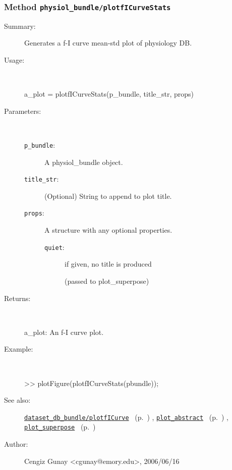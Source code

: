 \subsubsection[Method \texttt{plotfICurveStats}]{Method \texttt{physiol\_bundle/plotfICurveStats}}%
%
\label{ref_physiol_bundle__plotfICurveStats}%
\hypertarget{ref_physiol_bundle__plotfICurveStats}{}%
\begin{description}
\item[Summary:]Generates a f-I curve mean-std plot of physiology DB.
%
\item[Usage:]~%
\begin{lyxcode}%
a\_plot = plotfICurveStats(p\_bundle, title\_str, props)
%
\end{lyxcode}%
%
%
\item[Parameters:]~
\begin{description}%
\item[\texttt{p\_bundle}:]
 A physiol\_bundle object.
\item[\texttt{title\_str}:]
 (Optional) String to append to plot title.
\item[\texttt{props}:]
 A structure with any optional properties.
\begin{description}%
\item[\texttt{quiet}:]
 if given, no title is produced

(passed to plot\_superpose)\end{description}%
\end{description}%
%
\item[Returns:]~

	a\_plot: An f-I curve plot.
%
\item[Example:]~
\begin{lyxcode} >> plotFigure(plotfICurveStats(pbundle));\\%
\end{lyxcode}
%
\item[See also:]%
\hyperlink{ref_dataset_db_bundle__plotfICurve}{\texttt{dataset\_db\_bundle/plotfICurve}}%
\ (p.~\pageref{ref_dataset_db_bundle__plotfICurve})%
%
, \hyperlink{ref_plot_abstract}{\texttt{plot\_abstract}}%
\ (p.~\pageref{ref_plot_abstract})%
%
, \hyperlink{ref_plot_superpose}{\texttt{plot\_superpose}}%
\ (p.~\pageref{ref_plot_superpose})%
%
%
\item[Author:]%
Cengiz Gunay <cgunay@emory.edu>, 2006/06/16%
\end{description}
\methodline%

